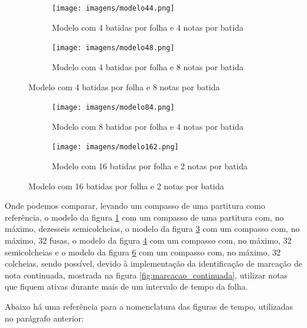 \documentclass[12pt]{report}
\begin{document}
\begin{figure}[H]
  \centering
  \begin{subfigure}{0.4\textwidth}
    \centering
    \texttt{[image: imagens/modelo44.png]}
    \caption{Modelo com 4 batidas por folha e 4 notas por batida}
    \label{fig:modelo44}
  \end{subfigure}
  \begin{subfigure}{0.4\textwidth}
    \centering
    \texttt{[image: imagens/modelo48.png]}
    \caption{Modelo com 4 batidas por folha e 8 notas por batida}
    \label{fig:modelo48}
  \end{subfigure}
\end{figure}

\begin{figure}[H]
  \centering
  \begin{subfigure}{0.4\textwidth}
    \centering
    \texttt{[image: imagens/modelo84.png]}
    \caption{Modelo com 8 batidas por folha e 4 notas por batida}
    \label{fig:modelo84}
  \end{subfigure}
  \begin{subfigure}{0.4\textwidth}
    \centering
    \texttt{[image: imagens/modelo162.png]}
    \caption{Modelo com 16 batidas por folha e 2 notas por batida}
    \label{fig:modelo162}
  \end{subfigure}
\end{figure}

Onde podemos comparar, levando um compasso de uma partitura como
referência, o modelo da figura \ref{fig:modelo44} com um compasso de
uma partitura com, no máximo, dezesseis semicolcheias, o modelo da
figura \ref{fig:modelo48} com um compasso com, no máximo, 32 fusas, o
modelo da figura \ref{fig:modelo84} com um compasso com, no máximo, 32
semicolcheias e o modelo da figura \ref{fig:modelo162} com um compasso
com, no máximo, 32 colcheias, sendo possível, devido à implementação
da identificação de marcação de nota continuada, mostrada na figura
\ref{fig:marcacao_continuada}, utilizar notas que fiquem ativas
durante mais de um intervalo de tempo da folha.

Abaixo há uma referência para a nomenclatura das figuras de tempo, utilizadas no parágrafo anterior:
\end{document}
